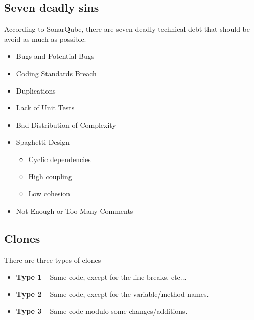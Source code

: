 \documentclass[a4paper,11pt]{report}
\begin{document}
	\subsection{Seven deadly sins}\noindent
		According to SonarQube, there are seven
			deadly technical debt that should be 
			avoid as much as possible.	
		\begin{itemize}
			\setlength{\itemsep}{0pt}		
			\setlength{\parskip}{0pt}		
			\setlength{\parsep}{0pt}	
			\item Bugs and Potential Bugs
			\item Coding Standards Breach
			\item Duplications
			\item Lack of Unit Tests
			\item Bad Distribution of Complexity
			\item Spaghetti Design
				\begin{itemize}	
					\setlength{\itemsep}{0pt}		
					\setlength{\parskip}{0pt}		
					\setlength{\parsep}{0pt}	
					\item Cyclic dependencies
					\item High coupling
					\item Low cohesion
				\end{itemize}
			\item Not Enough or Too Many Comments
		\end{itemize}
	\subsection{Clones}\noindent
		There are three types of clones
		\begin{itemize}
			\setlength{\itemsep}{0pt}		
			\setlength{\parskip}{0pt}		
			\setlength{\parsep}{0pt}	
			\item \textbf{Type 1} -- Same code,
				except for the line breaks, etc...
			\item \textbf{Type 2} -- Same code,
				except for the variable/method
				names.
			\item \textbf{Type 3} -- Same code 
				modulo some changes/additions.
		\end{itemize}
%
\end{document}

